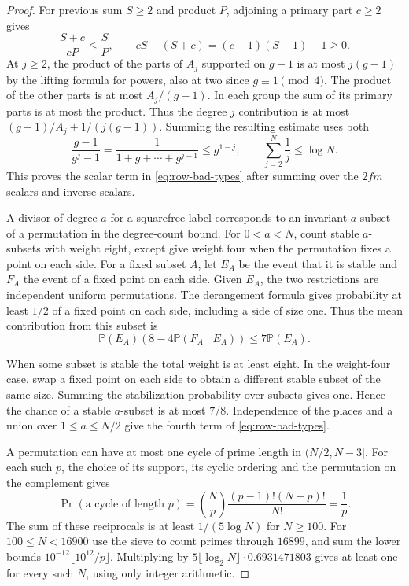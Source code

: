 \begin{proof}
For previous sum \(S\ge2\) and product \(P\), adjoining a primary part
\(c\ge2\) gives
\[
 \frac{S+c}{cP}\le\frac S P,
 \qquad cS-(S+c)=(c-1)(S-1)-1\ge0 .
\] At $j\ge2$, the product of the parts of
$A_j$ supported on $g-1$ is at most $j(g-1)$ by the lifting
formula for powers, also at two since $g\equiv1\pmod4$.
The product of the other parts is at most $A_j/(g-1)$.
In each group the sum of its primary parts is at most the
product. Thus the degree $j$ contribution is at most
$(g-1)/A_j+1/(j(g-1))$. Summing the resulting estimate uses both
\[
  \frac{g-1}{g^j-1}=\frac{1}{1+g+\cdots+g^{j-1}}\le g^{1-j},\qquad \sum_{j=2}^N\frac1j\le\log N.
\]
 This proves the scalar term
in \eqref{eq:row-bad-types} after summing over the $2fm$
scalars and inverse scalars.
\label{cor:paired-type-mass-2}

A divisor of degree $a$ for a squarefree label corresponds to
an invariant $a$-subset of a permutation in the degree-count
bound. For $0<a<N$, count stable $a$-subsets with weight eight,
except give weight four when the permutation fixes a point on
each side. For a fixed subset \(A\), let \(E_A\) be the event that
it is stable and \(F_A\) the event of a fixed point on
each side. Given \(E_A\), the two restrictions are
independent uniform permutations. The derangement formula
gives probability at least \(1/2\) of a fixed point on
each side, including a side of size one. Thus the mean
contribution from this subset is
\[
 \mathbb P(E_A)(8-4\mathbb P(F_A\mid E_A))\le7\mathbb P(E_A).
\]

When some subset is
stable the total weight is at least eight. In the weight-four
case, swap a fixed point on each side to obtain a different
stable subset of the same size. Summing the stabilization
probability over subsets gives one. Hence the chance of a
stable $a$-subset is at most $7/8$. Independence of the places
and a union over $1\le a\le N/2$ give the fourth term of
\eqref{eq:row-bad-types}.

A permutation can have at most one cycle of prime length in
$(N/2,N-3]$. For each such \(p\), the choice of its support, its cyclic ordering and the permutation on the complement gives
\[
  \Pr(\text{a cycle of length }p)=\binom Np\frac{(p-1)!(N-p)!}{N!}=\frac1p.
\]
 The sum of these reciprocals is at least
$1/(5\log N)$ for $N\ge100$. For $100\le N<16900$ use the sieve to count primes through
$16899$, and sum the lower bounds $10^{-12}\lfloor10^{12}/p\rfloor$.
Multiplying by $5\lfloor\log_2 N\rfloor\cdot0.6931471803$ gives
at least one for every such $N$, using only integer arithmetic.


\end{proof}
